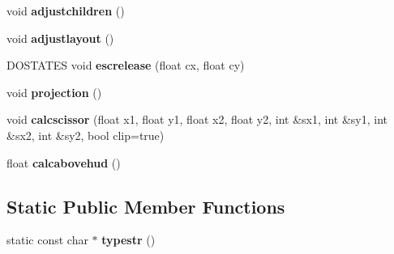 \begin{DoxyCompactItemize}
\mbox{\label{struct_u_i_1_1_window_aa9c4b9e0e539211d069fc28519235d7d}} 
void {\bfseries adjustchildren} ()
\item 
\mbox{\label{struct_u_i_1_1_window_a8d42b6dca6ee811b091621f27c564496}} 
void {\bfseries adjustlayout} ()
\item 
\mbox{\label{struct_u_i_1_1_window_a58121e5f37099a9a4fd7c623c4ea5539}} 
D\+O\+S\+T\+A\+T\+ES void {\bfseries escrelease} (float cx, float cy)
\item 
\mbox{\label{struct_u_i_1_1_window_a1be660d00545f2a70ac1af15bc5570f2}} 
void {\bfseries projection} ()
\item 
\mbox{\label{struct_u_i_1_1_window_abecc737213af70f55ecaefbc35ca69df}} 
void {\bfseries calcscissor} (float x1, float y1, float x2, float y2, int \&sx1, int \&sy1, int \&sx2, int \&sy2, bool clip=true)
\item 
\mbox{\label{struct_u_i_1_1_window_a82952983e4b80f708bd8efc1f2e0a853}} 
float {\bfseries calcabovehud} ()
\end{DoxyCompactItemize}
\subsection*{Static Public Member Functions}
\begin{DoxyCompactItemize}
\item 
\mbox{\label{struct_u_i_1_1_window_a068a74ff5f843b669f65e036184782dc}} 
static const char $\ast$ {\bfseries typestr} ()
\end{DoxyCompactItemize}
